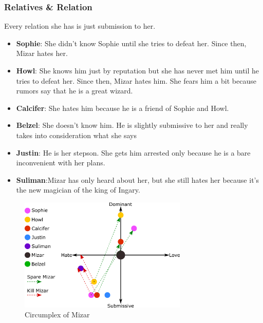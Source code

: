 
\subsubsection*{Relatives \& Relation}
Every relation she has is just submission to her.
\begin{itemize}
\item \textbf{Sophie}: She didn’t know Sophie until she tries to defeat her. Since then, Mizar hates her.
\item \textbf{Howl}: She knows him just by reputation but she has never met him until he tries to defeat her. Since then, Mizar hates him. She fears him a bit because rumors say that he is a great wizard.
\item \textbf{Calcifer}: She hates him because he is a friend of Sophie and Howl.
\item \textbf{Belzel}: She doesn’t know him. He is slightly submissive to her and really takes into consideration what she says
\item \textbf{Justin}: He is her stepson. She gets him arrested only because he is a bare  inconvenient with her plans. 
\item \textbf{Suliman}:Mizar has only heard about her, but she still hates her because it’s the new magician of the king of Ingary.
\end{itemize}

\begin{figure}[H]
  \centering
  \includegraphics[width=8cm]{Images/Circumplexes/mizarCircumplex}
  \caption{Circumplex of Mizar}
\end{figure}

